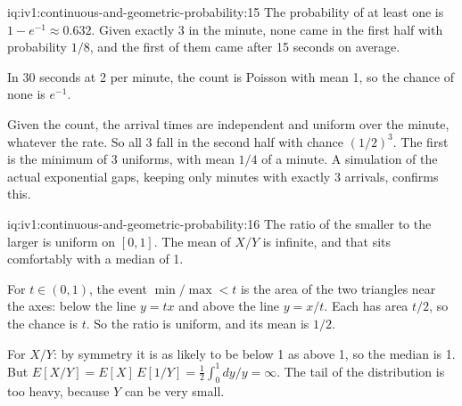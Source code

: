 \begin{solution}{iq:iv1:continuous-and-geometric-probability:15}
The probability of at least one is $1 - e^{-1} \approx 0.632$. Given exactly 3 in the minute, none came in the first half with probability $1/8$, and the first of them came after 15 seconds on average.

In 30 seconds at 2 per minute, the count is Poisson with mean 1, so the chance of none is $e^{-1}$.

Given the count, the arrival times are independent and uniform over the minute, whatever the rate. So all 3 fall in the second half with chance $(1/2)^3$. The first is the minimum of 3 uniforms, with mean $1/4$ of a minute. A simulation of the actual exponential gaps, keeping only minutes with exactly 3 arrivals, confirms this.

\end{solution}

\begin{solution}{iq:iv1:continuous-and-geometric-probability:16}
The ratio of the smaller to the larger is uniform on $[0, 1]$. The mean of $X/Y$ is infinite, and that sits comfortably with a median of 1.

For $t \in (0, 1)$, the event $\min/\max < t$ is the area of the two triangles near the axes: below the line $y = tx$ and above the line $y = x/t$. Each has area $t/2$, so the chance is $t$. So the ratio is uniform, and its mean is $1/2$.

For $X/Y$: by symmetry it is as likely to be below 1 as above 1, so the median is 1. But $E[X/Y] = E[X]\,E[1/Y] = \tfrac12 \int_0^1 dy/y = \infty$. The tail of the distribution is too heavy, because $Y$ can be very small.

\end{solution}

